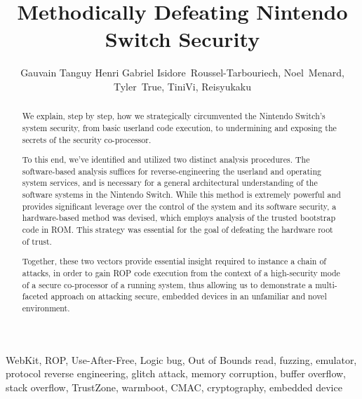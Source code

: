 \documentclass[journal]{IEEEtran}
\begin{document}


\title{Methodically Defeating Nintendo Switch Security}

\author{Gauvain Tanguy Henri Gabriel Isidore~Roussel-Tarbouriech,
        Noel~Menard,
        Tyler~True,
        TiniVi,
        Reisyukaku\vspace{-2.0em}}

\maketitle

\begin{abstract}
We explain, step by step, how we strategically circumvented the Nintendo Switch's
system security, from basic userland code execution, to undermining and exposing
the secrets of the security co-processor. 

To this end, we've identified and utilized two distinct analysis procedures.
The software-based analysis suffices for reverse-engineering the userland and
operating system services, and is necessary for a general architectural 
understanding of the software systems in the Nintendo Switch. While this method is
extremely powerful and provides significant leverage over the control of the
system and its software security, a hardware-based method was devised, which
employs analysis of the trusted bootstrap code in ROM. This strategy was essential for
the goal of defeating the hardware root of trust.

Together, these two vectors provide essential insight required to instance a chain
of attacks, in order to gain ROP code execution from the context of a high-security mode
of a secure co-processor of a running system, thus allowing us to demonstrate a
multi-faceted approach on attacking secure, embedded devices in an unfamiliar 
and novel environment.
\end{abstract}

\begin{IEEEkeywords}
WebKit, ROP, Use-After-Free, Logic bug, Out of Bounds read, fuzzing, emulator,
protocol reverse engineering, glitch attack, memory corruption, buffer overflow,
stack overflow, TrustZone, warmboot, CMAC, cryptography, embedded device
\end{IEEEkeywords}
\end{document}
